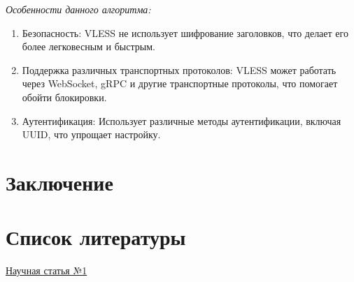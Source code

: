 \documentclass[utf8,14pt,a4paper,oneside,russian]{book}
\begin{document}
\textit{Особенности данного алгоритма:}
\begin{enumerate}
    \item Безопасность: VLESS не использует шифрование заголовков, что делает его более легковесным и быстрым.
    \item Поддержка различных транспортных протоколов: VLESS может работать через WebSocket, gRPC и другие транспортные протоколы, что помогает обойти блокировки.
    \item Аутентификация: Использует различные методы аутентификации, включая UUID, что упрощает настройку.
\end{enumerate}


\newpage
\section{Заключение}



\newpage
\section{Список литературы}

\href{https://www.sciencedirect.com/science/article/pii/S1742287619302002}{Научная статья №1}
\end{document}
